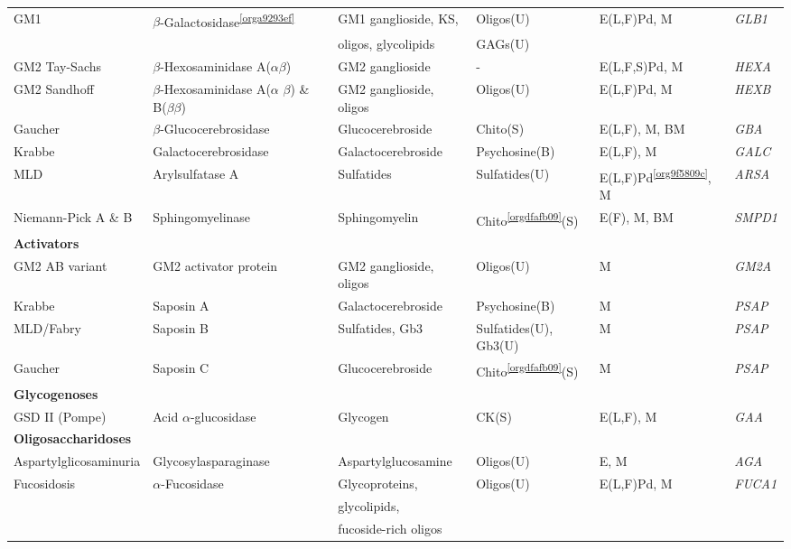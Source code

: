 \documentclass[landscape]{article}
\begin{document}
\begin{longtable}{llllll}
GM1 & \(\beta\)-Galactosidase\textsuperscript{\ref{orga9293ef}} & GM1 ganglioside, KS, & Oligos(U) & E(L,F)Pd, M & \emph{GLB1}\\
 &  & oligos, glycolipids & GAGs(U) &  & \\
GM2 Tay-Sachs & \(\beta\)-Hexosaminidase A(\sout{\(\alpha\)}\(\beta\)) & GM2 ganglioside & - & E(L,F,S)Pd\footnotemark, M & \emph{HEXA}\\
GM2 Sandhoff & \(\beta\)-Hexosaminidase A(\(\alpha\) \sout{\(\beta\)}) \& B(\sout{\(\beta \beta\)}) & GM2 ganglioside, oligos & Oligos(U) & E(L,F)Pd, M & \emph{HEXB}\\
Gaucher & \(\beta\)-Glucocerebrosidase & Glucocerebroside & Chito\footnotemark(S) & E(L,F), M, BM & \emph{GBA}\\
Krabbe & Galactocerebrosidase & Galactocerebroside & Psychosine(B) & E(L,F), M & \emph{GALC}\\
MLD & Arylsulfatase A & Sulfatides & Sulfatides(U) & E(L,F)Pd\textsuperscript{\ref{org9f5809c}}, M & \emph{ARSA}\\
Niemann-Pick A \& B & Sphingomyelinase & Sphingomyelin & Chito\textsuperscript{\ref{orgdfafb09}}(S) & E(F), M, BM & \emph{SMPD1}\\
\hline
\textbf{Activators} &  &  &  &  & \\
GM2 AB variant & GM2 activator protein & GM2 ganglioside, oligos & Oligos(U) & M & \emph{GM2A}\\
Krabbe & Saposin A & Galactocerebroside & Psychosine(B) & M & \emph{PSAP}\\
MLD/Fabry & Saposin B & Sulfatides, Gb3 & Sulfatides(U), Gb3(U) & M & \emph{PSAP}\\
Gaucher & Saposin C & Glucocerebroside & Chito\textsuperscript{\ref{orgdfafb09}}(S) & M & \emph{PSAP}\\
\hline
\textbf{Glycogenoses} &  &  &  &  & \\
GSD II (Pompe) & Acid \(\alpha\)-glucosidase & Glycogen & CK(S) & E(L\footnotemark,F), M & \emph{GAA}\\
\hline
\textbf{Oligosaccharidoses} &  &  &  &  & \\
Aspartylglicosaminuria & Glycosylasparaginase & Aspartylglucosamine & Oligos(U) & E, M & \emph{AGA}\\
Fucosidosis & \(\alpha\)-Fucosidase & Glycoproteins, & Oligos(U) & E(L,F)Pd, M & \emph{FUCA1}\\
 &  & glycolipids, &  &  & \\
 &  & fucoside-rich oligos &  &  & \\

\end{longtable}
\end{document}
